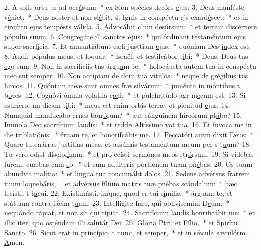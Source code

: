 2. A solis ortu us ad occ\uline{á}sum:~* ex Sion spécies decórs \uline{e}jus.
3. Deus manféste v\uline{é}niet:~* Deus noster et non sl\uline{é}bit.
4. Ignis in conspéctu ejs exard\uline{é}scet:~* et in circúitu ejus tempésts v\uline{á}lida.
5. Advocábit clum des\uline{ú}rsum:~* et terram discérnere pópulm s\uline{u}um.
6. Congregáte ill sanctos \uline{e}jus:~* qui órdinant testaméntum ejus super sacrf\uline{í}cia.
7. Et annuntiábunt cæli justtiam \uline{e}jus:~* quóniam Des j\uline{u}dex est.
8. Audi, pópulus meus, et loquar:~† Israël, et testifcábor t\uline{i}bi:~* Deus, Deus tus \uline{e}go sum.
9. Non in sacrifíciis tus árgu\uline{a}m te:~* holocáusta autem tua in conspéctu meo snt s\uline{e}mper.
10. Non accípiam de dom tua v\uline{í}tulos:~* neque de grégibus tus h\uline{i}rcos.
11. Quóniam meæ sunt omnes fræ silv\uline{á}rum:~* juménta in móntibus t b\uline{o}ves.
12. Cognóvi ómnia volatlia c\uline{æ}li:~* et pulchritúdo agr m\uline{e}cum est.
13. Si esuríero, nn dicam t\uline{i}bi:~* meus est enim orbis terræ, et plenitúd \uline{e}jus.
14. Numquid manducábo crnes taur\uline{ó}rum?~* aut sánguinem hircórum pt\uline{á}bo?
15. Immola Deo sacrifcium l\uline{au}dis:~* et redde Altíssimo vot t\uline{u}a.
16. Et ínvoca me in die triblati\uline{ó}nis:~* éruam te, et honorifc\uline{á}bis me.
17. Peccatóri autm dixit D\uline{e}us:~* Quare tu enárras justítias meas, et assúmis testaméntum meum per s t\uline{u}um?
18. Tu vero odíst discipl\uline{í}nam:~* et projecísti sermónes meos rtr\uline{ó}rsum:
19. Si vidébas furem, currbas cum \uline{e}o:~* et cum adúlteris portiónem tuam pn\uline{é}bas.
20. Os tuum abundvit mal\uline{í}tia:~* et lingua tua concinnábt d\uline{o}los.
21. Sedens advérsus fratrem tuum loquebáris,~† et advérsus fílium matris tuæ pnébas sc\uline{á}ndalum:~* hæc fecísti, t t\uline{á}cui.
22. Existimásti, iníque, quod er tui s\uline{í}milis:~* árguam te, et státuam contra fácim t\uline{u}am.
23. Intellígite hæc, qui obliviscmini D\uline{e}um:~* nequándo rápiat, et non sit qui r\uline{í}piat.
24. Sacrifícium laudis honrific\uline{á}bit me:~* et illic iter, quo osténdam illi salutár D\uline{e}i.
25. Glória Ptri, et F\uline{í}lio,~* et Spirítu S\uline{a}ncto.
26. Sicut erat in princípio, t nunc, et s\uline{e}mper,~* et in sǽcula sæculórm. \uline{A}men.
